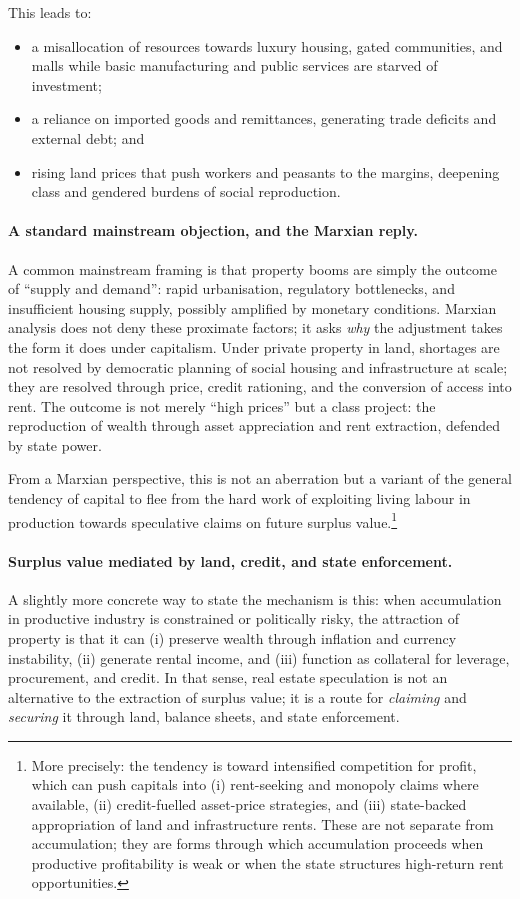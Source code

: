 This leads to:

\begin{itemize}[leftmargin=1.5em]
  \item a misallocation of resources towards luxury housing, gated
  communities, and malls while basic manufacturing and public services are
  starved of investment;
  \item a reliance on imported goods and remittances, generating trade
  deficits and external debt; and
  \item rising land prices that push workers and peasants to the margins,
  deepening class and gendered burdens of social reproduction.
\end{itemize}

\paragraph{A standard mainstream objection, and the Marxian reply.}
A common mainstream framing is that property booms are simply the outcome of ``supply and demand'': rapid
urbanisation, regulatory bottlenecks, and insufficient housing supply, possibly amplified by monetary
conditions. Marxian analysis does not deny these proximate factors; it asks \emph{why} the adjustment takes
the form it does under capitalism. Under private property in land, shortages are not resolved by democratic
planning of social housing and infrastructure at scale; they are resolved through price, credit rationing,
and the conversion of access into rent. The outcome is not merely ``high prices'' but a class project: the
reproduction of wealth through asset appreciation and rent extraction, defended by state power.

From a Marxian perspective, this is not an aberration but a variant of the
general tendency of capital to flee from the hard work of exploiting living
labour in production towards speculative claims on future surplus value.\footnote{More precisely: the tendency is toward intensified competition for profit, which can push capitals into (i) rent-seeking and monopoly claims where available, (ii) credit-fuelled asset-price strategies, and (iii) state-backed appropriation of land and infrastructure rents. These are not separate from accumulation; they are forms through which accumulation proceeds when productive profitability is weak or when the state structures high-return rent opportunities.}

\paragraph{Surplus value mediated by land, credit, and state enforcement.}
A slightly more concrete way to state the mechanism is this: when accumulation in productive industry is
constrained or politically risky, the attraction of property is that it can (i) preserve wealth through
inflation and currency instability, (ii) generate rental income, and (iii) function as collateral for leverage,
procurement, and credit. In that sense, real estate speculation is not an alternative to the extraction of
surplus value; it is a route for \emph{claiming} and \emph{securing} it through land, balance sheets, and state
enforcement.

